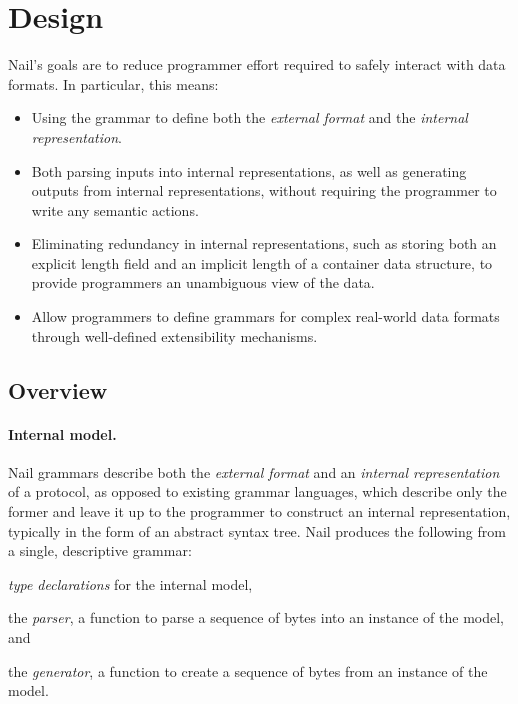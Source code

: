 \section{Design}
\label{s:design}

Nail's goals are to reduce programmer effort required to safely interact
with data formats.  In particular, this means:

\begin{itemize}

\item Using the grammar to define both the \emph{external format}
      and the \emph{internal representation}.

\item Both parsing inputs into internal representations, as well as
      generating outputs from internal representations, without
      requiring the programmer to write any semantic actions.

\item Eliminating redundancy in internal representations, such as
      storing both an explicit length field and an implicit length
      of a container data structure, to provide programmers
      an unambiguous view of the data.

\item Allow programmers to define grammars for complex real-world
      data formats through well-defined extensibility mechanisms.

\end{itemize}

\subsection{Overview}

\paragraph{Internal model.}

Nail grammars describe both the \emph{external format} and an
\emph{internal representation} of a protocol, as opposed to existing
grammar languages, which describe only the former and leave it up to
the programmer to construct an internal representation, typically in
the form of an abstract syntax tree.
Nail produces the following from a single, descriptive grammar: 

\begin{CompactItemize}
\item \textit{type declarations} for the internal model,
\item the \textit{parser}, a function to parse a sequence of bytes into an
instance of the model, and
\item the \textit{generator}, a function to create a
sequence of bytes from an instance of the model.
\end{CompactItemize}

